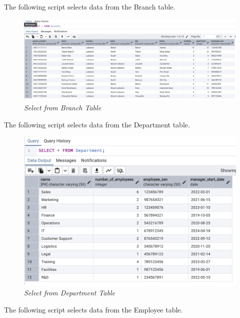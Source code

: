 The following script selects data from the Branch table.


\begin{figure}[H]
  \centering
  \includegraphics[width=1\textwidth]{images/sql/select/branch.png}
  \caption{\textit{Select from Branch Table}}
\end{figure}

The following script selects data from the Department table.


\begin{figure}[H]
  \centering
  \includegraphics[width=1\textwidth]{images/sql/select/department.png}
  \caption{\textit{Select from Department Table}}
\end{figure}

The following script selects data from the Employee table.


